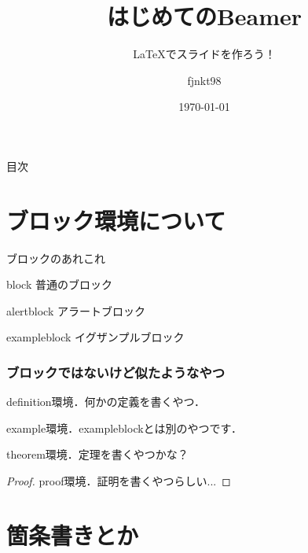 \documentclass[dvipdfmx, 12pt]{beamer}  %
\title{はじめてのBeamer}
\subtitle{LaTeXでスライドを作ろう！}
\author{fjnkt98}
\date{\today}
\institute{National Institute of Technologie, Ichinoseki College}
\begin{document}
  \maketitle

  \begin{frame}{目次}
    \tableofcontents
  \end{frame}

  \section{ブロック環境について}

  \begin{frame}{ブロックのあれこれ}
    \begin{block}{block}
      普通のブロック
    \end{block}

    \begin{alertblock}{alertblock}
      アラートブロック
    \end{alertblock}

    \begin{exampleblock}{exampleblock}
      イグザンプルブロック
    \end{exampleblock}
  \end{frame}

  \begin{frame}
    \frametitle{ブロックではないけど似たようなやつ}
    \begin{definition}
      definition環境．何かの定義を書くやつ．
    \end{definition}

    \begin{example}
      example環境．exampleblockとは別のやつです．
    \end{example}

    \begin{theorem}
      theorem環境．定理を書くやつかな？
    \end{theorem}

    \begin{proof}
      proof環境．証明を書くやつらしい...
    \end{proof}
  \end{frame}

  \section{箇条書きとか}
\end{document}
